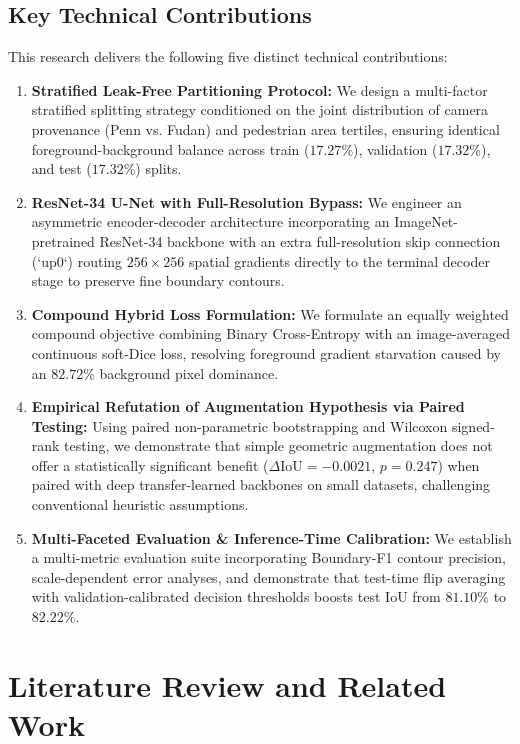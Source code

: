 \documentclass[10pt,a4paper]{article}
\begin{document}
\subsection{Key Technical Contributions}
This research delivers the following five distinct technical contributions:
\begin{enumerate}
    \item \textbf{Stratified Leak-Free Partitioning Protocol:} We design a multi-factor stratified splitting strategy conditioned on the joint distribution of camera provenance (Penn vs. Fudan) and pedestrian area tertiles, ensuring identical foreground-background balance across train ($17.27\%$), validation ($17.32\%$), and test ($17.32\%$) splits.
    \item \textbf{ResNet-34 U-Net with Full-Resolution Bypass:} We engineer an asymmetric encoder-decoder architecture incorporating an ImageNet-pretrained ResNet-34 backbone with an extra full-resolution skip connection (`up0`) routing $256 \times 256$ spatial gradients directly to the terminal decoder stage to preserve fine boundary contours.
    \item \textbf{Compound Hybrid Loss Formulation:} We formulate an equally weighted compound objective combining Binary Cross-Entropy with an image-averaged continuous soft-Dice loss, resolving foreground gradient starvation caused by an $82.72\%$ background pixel dominance.
    \item \textbf{Empirical Refutation of Augmentation Hypothesis via Paired Testing:} Using paired non-parametric bootstrapping and Wilcoxon signed-rank testing, we demonstrate that simple geometric augmentation does not offer a statistically significant benefit ($\Delta \text{IoU} = -0.0021$, $p = 0.247$) when paired with deep transfer-learned backbones on small datasets, challenging conventional heuristic assumptions.
    \item \textbf{Multi-Faceted Evaluation \& Inference-Time Calibration:} We establish a multi-metric evaluation suite incorporating Boundary-F1 contour precision, scale-dependent error analyses, and demonstrate that test-time flip averaging with validation-calibrated decision thresholds boosts test IoU from $81.10\%$ to $82.22\%$.
\end{enumerate}

\section{Literature Review and Related Work}
\end{document}
